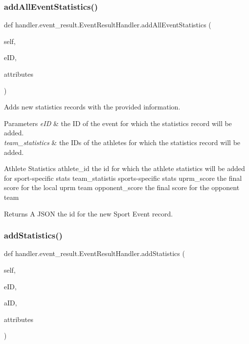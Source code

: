 \subsubsection{\texorpdfstring{add\+All\+Event\+Statistics()}{addAllEventStatistics()}}
{\footnotesize\ttfamily def handler.\+event\+\_\+result.\+Event\+Result\+Handler.\+add\+All\+Event\+Statistics (\begin{DoxyParamCaption}\item[{}]{self,  }\item[{}]{e\+ID,  }\item[{}]{attributes }\end{DoxyParamCaption})}



Adds new statistics records with the provided information. 


\begin{DoxyParams}{Parameters}
{\em e\+ID} & the ID of the event for which the statistics record will be added. \\
\hline
{\em team\+\_\+statistics} & the I\+Ds of the athletes for which the statistics record will be added.\\
\hline
\end{DoxyParams}
\begin{DoxyParagraph}{Athlete Statistics}
athlete\+\_\+id the id for which the athlete statistics will be added for sport-\/specific stats team\+\_\+statistis sports-\/specific stats uprm\+\_\+score the final score for the local uprm team opponent\+\_\+score the final score for the opponent team
\end{DoxyParagraph}
\begin{DoxyReturn}{Returns}
A J\+S\+ON the id for the new Sport Event record. 
\end{DoxyReturn}
\mbox{\label{classhandler_1_1event__result_1_1_event_result_handler_a9301cbd74cac9840cb8a0a4a81aaf813}} 
\subsubsection{\texorpdfstring{add\+Statistics()}{addStatistics()}}
{\footnotesize\ttfamily def handler.\+event\+\_\+result.\+Event\+Result\+Handler.\+add\+Statistics (\begin{DoxyParamCaption}\item[{}]{self,  }\item[{}]{e\+ID,  }\item[{}]{a\+ID,  }\item[{}]{attributes }\end{DoxyParamCaption})}



